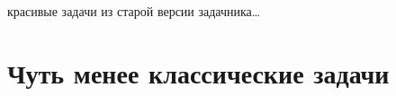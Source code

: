 \documentclass[nobib]{tufte-handout}
\theoremstyle{definition}
\newcounter{problem}
\newenvironment{problem}%
{%
\refstepcounter{problem}%
     \hypertarget{problem:{\theproblem}}{}
     \Writetofile{solution_file}{\protect\hypertarget{soln:\theproblem}{}}
     \begin{myenum}[label=\bfseries\protect\hyperlink{soln:\theproblem}{\theproblem},ref=\theproblem]
     \item%
    }%
    {%
    \end{myenum}}
\begin{document}

красивые задачи из старой версии задачника\ldots



\section{Чуть менее классические задачи}
\end{document}
